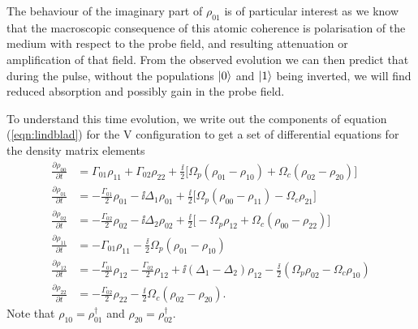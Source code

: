     The behaviour of the imaginary part of $\rho_{01}$ is of particular interest
    as we know that the macroscopic consequence of this atomic coherence is
    polarisation of the medium with respect to the probe field, and resulting
    attenuation or amplification of that field. From the observed evolution we
    can then predict that during the pulse, without the populations $\Ket{0}$
    and $\Ket{1}$ being inverted, we will find reduced absorption and possibly
    gain in the probe field.

    To understand this time evolution, we write out the components of equation
    (\ref{eqn:lindblad}) for the V configuration to get a set of differential
    equations for the density matrix elements
    \begin{subequations}
    \begin{align}
    \frac{\partial \rho_{00}}{\partial t} &= \Gamma_{01} \rho_{11} + \Gamma_{02} 
    \rho_{22} + \frac{\ii}{2} \bigg[ \Omega_p 
    ( \rho_{01} - \rho_{10}) + \Omega_c ( \rho_{02} - \rho_{20}) \bigg] \\
    \frac{\partial \rho_{01}}{\partial t} &= -\frac{\Gamma_{01}}{2} \rho_{01} - 
    \ii \Delta_1 \rho_{01} + \frac{\ii}{2} \bigg[ \Omega_p 
    (\rho_{00} - \rho_{11}) - \Omega_c \rho_{21} \bigg] \\
    \frac{\partial \rho_{02}}{\partial t} &= -\frac{\Gamma_{02}}{2} \rho_{02} - 
    \ii \Delta_2 \rho_{02} + \frac{\ii}{2} \bigg[ -\Omega_p \rho_{12} + \Omega_c 
    ( \rho_{00} - \rho_{22} ) \bigg] \\
    \frac{\partial \rho_{11}}{\partial t} &= -\Gamma_{01} \rho_{11} - 
    \frac{\ii}{2} \Omega_p (\rho_{01} - \rho_{10}) \\
    \frac{\partial \rho_{12}}{\partial t} &= -\frac{\Gamma_{01}}{2} \rho_{12} - 
    \frac{\Gamma_{02}}{2} \rho_{12} + \ii (\Delta_1 - \Delta_2) \rho_{12} - 
    \frac{\ii}{2} (\Omega_p \rho_{02} - \Omega_c{\rho_{10}})\\
    \frac{\partial \rho_{22}}{\partial t} &= -\frac{\Gamma_{02}}{2} \rho_{22} - 
    \frac{\ii}{2} \Omega_c ( \rho_{02} - \rho_{20} ).
    \end{align}
    \label{eqn:vee_dm_equations}
    \end{subequations}
    Note that $\rho_{10} = \rho_{01}^\dagger$ and $\rho_{20} = \rho_{02}^\dagger$.


